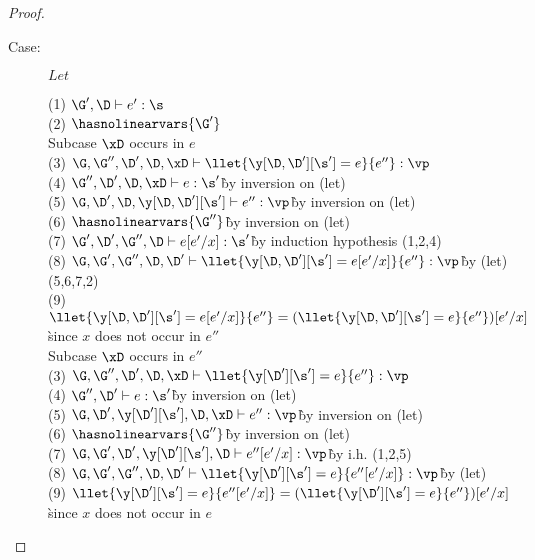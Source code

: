 \begin{proof}
\begin{description}
\item[Case:] $Let$
\begin{tabbing}
    (1) $\G',\D \vdash e' : \s$\\
    (2) $\hasnolinearvars{\G'}$\\
    Subcase $\xD$ occurs in $e$\\
    (3) $\G, \G'', \D', \D, \xD \vdash \llet{\y[\D,\D'][\s'] = e}{e''} : \vp$\\
    (4) $\G'',\D', \D, \xD \vdash e : \s'$\` by inversion on (let)\\
    (5) $\G,\D',\D,\y[\D,\D'][\s'] \vdash e'' : \vp$\` by inversion on (let)\\
    (6) $\hasnolinearvars{\G''}$\` by inversion on (let)\\
    (7) $\G',\D',\G'',\D \vdash e[e'/x] : \s'$\` by induction hypothesis (1,2,4)\\
    (8) $\G,\G',\G'',\D,\D' \vdash \llet{\y[\D,\D'][\s'] = e[e'/x]}{e''} : \vp$\` by (let) (5,6,7,2)\\
    (9) $\llet{\y[\D,\D'][\s'] = e[e'/x]}{e''} = (\llet{\y[\D,\D'][\s'] = e}{e''})[e'/x]$\` since $x$ does not occur in $e''$\\
    Subcase $\xD$ occurs in $e''$\\
    (3) $\G, \G'', \D', \D, \xD \vdash \llet{\y[\D'][\s'] = e}{e''} : \vp$\\
    (4) $\G'',\D' \vdash e : \s'$\` by inversion on (let)\\
    (5) $\G,\D',\y[\D'][\s'],\D,\xD \vdash e'' : \vp$\` by inversion on (let)\\
    (6) $\hasnolinearvars{\G''}$\` by inversion on (let)\\
    (7) $\G,\G',\D',\y[\D'][\s'],\D \vdash e''[e'/x] : \vp$\` by i.h. (1,2,5)\\
    (8) $\G,\G',\G'',\D,\D' \vdash \llet{\y[\D'][\s'] = e}{e''[e'/x]} : \vp$\` by (let)\\
    (9) $\llet{\y[\D'][\s'] = e}{e''[e'/x]} = (\llet{\y[\D'][\s'] = e}{e''})[e'/x]$\` since $x$ does not occur in $e$\\
\end{tabbing}

\end{description}

\end{proof}

